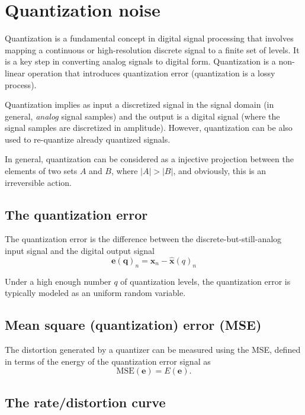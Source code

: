 \chapter{Quantization noise}

Quantization is a fundamental concept in digital signal processing
that involves mapping a continuous or high-resolution discrete signal
to a finite set of levels. It is a key step in converting analog
signals to digital form. Quantization is a non-linear operation that
introduces quantization error (quantization is a lossy process).

Quantization implies as input a discretized signal in the signal
domain (in general, \emph{analog} signal samples) and the output is a
digital signal (where the signal samples are discretized in
amplitude). However, quantization can be also used to re-quantize
already quantized signals.

In general, quantization can be considered as a injective
projection between the elements of two sets $A$ and $B$, where
$|A|>|B|$, and obviously, this is an irreversible action.

\section{The quantization error}

The quantization error is the difference between the
discrete-but-still-analog input signal and the digital output signal
\begin{equation}
  \mathbf{e(q)}_n = \mathbf{x}_n - \hat{\mathbf{x}}(q)_n
\end{equation}

Under a high enough number $q$ of quantization levels, the
quantization error is typically modeled as an uniform random variable.

\section{Mean square (quantization) error (MSE)}

The distortion generated by a quantizer can be measured using the
\gls{MSE}, defined in terms of the energy of the quantization error
signal as
\begin{equation}
  \text{MSE}(\mathbf{e})=E(\mathbf{e}).
\end{equation}
    
\section{The rate/distortion curve}

